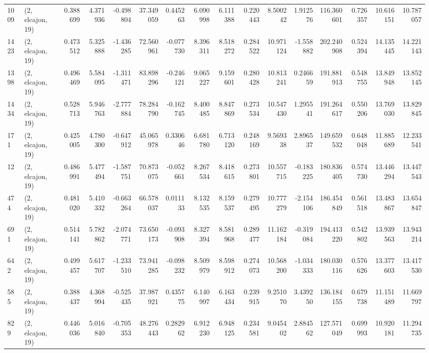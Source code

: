 \begin{tabular}{llrrrrrrrrrrrrrr}
1009 &  (2, elcajon, 19) &   0.388699 &   4.371936 &  -0.498804 &     37.349059 &    0.445263 &    6.090998 &    6.111388 &  0.220443 &   8.500242 &   1.912576 &   116.360601 &   0.726357 &  10.616151 &  10.787057 \\
1423 &  (2, elcajon, 19) &   0.473512 &   5.325888 &  -1.436285 &     72.560961 &   -0.077730 &    8.396311 &    8.518272 &  0.284522 &  10.971124 &  -1.558882 &   202.240908 &   0.524394 &  14.135445 &  14.221143 \\
1398 &  (2, elcajon, 19) &   0.496469 &   5.584095 &  -1.311471 &     83.898296 &   -0.246121 &    9.065227 &    9.159601 &  0.280428 &  10.813241 &   0.246659 &   191.881913 &   0.548755 &  13.849948 &  13.852145 \\
1434 &  (2, elcajon, 19) &   0.528713 &   5.946763 &  -2.777884 &     78.284790 &   -0.162745 &    8.400485 &    8.847869 &  0.273534 &  10.547430 &   1.295541 &   191.264617 &   0.550206 &  13.769030 &  13.829845 \\
171  &  (2, elcajon, 19) &   0.425005 &   4.780300 &  -0.647912 &     45.065978 &    0.330646 &    6.681780 &    6.713120 &  0.248169 &   9.569338 &   2.896537 &   149.659532 &   0.648048 &  11.885689 &  12.233541 \\
12   &  (2, elcajon, 19) &   0.486991 &   5.477494 &  -1.587751 &     70.873075 &   -0.052661 &    8.267534 &    8.418615 &  0.273801 &  10.557715 &  -0.183225 &   180.836405 &   0.574730 &  13.446294 &  13.447543 \\
474  &  (2, elcajon, 19) &   0.481020 &   5.410332 &  -0.663264 &     66.578037 &    0.011133 &    8.132535 &    8.159537 &  0.279495 &  10.777279 &  -2.154106 &   186.454849 &   0.561518 &  13.483867 &  13.654847 \\
691  &  (2, elcajon, 19) &   0.514141 &   5.782862 &  -2.074771 &     73.650173 &   -0.093908 &    8.327394 &    8.581968 &  0.289477 &  11.162184 &  -0.319084 &   194.413220 &   0.542802 &  13.939563 &  13.943214 \\
642  &  (2, elcajon, 19) &   0.499457 &   5.617707 &  -1.233510 &     73.941285 &   -0.098232 &    8.509979 &    8.598912 &  0.274073 &  10.568200 &  -1.034333 &   180.030116 &   0.576626 &  13.377603 &  13.417530 \\
585  &  (2, elcajon, 19) &   0.388437 &   4.368994 &  -0.525435 &     37.987921 &    0.435775 &    6.140997 &    6.163434 &  0.239915 &   9.251070 &   3.439250 &   136.184155 &   0.679738 &  11.151489 &  11.669797 \\
829  &  (2, elcajon, 19) &   0.446036 &   5.016840 &  -0.705353 &     48.276443 &    0.282962 &    6.912230 &    6.948125 &  0.234581 &   9.045402 &   2.884562 &   127.571049 &   0.699993 &  10.920181 &  11.294735 \\

\end{tabular}
